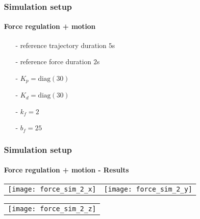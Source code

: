 \begin{frame}
  \frametitle{Simulation setup}
  \framesubtitle{Force regulation + motion}
  \begin{itemize}
  \item[-] reference trajectory duration $5$s
  \item[-] reference force duration $2$s
  \item[-] $K_p = \mathrm{diag}(30)$
  \item[-] $K_d = \mathrm{diag}(30)$
  \item[-] $k_{f} = 2$
  \item[-] $b_f = 25$
  \end{itemize}
\end{frame}

\begin{frame}
  \frametitle{Simulation setup}
  \framesubtitle{Force regulation + motion - Results}
  \begin{center}
   \vskip-0.1in
    \begin{tabular}{cc}
      \texttt{[image: force\_sim\_2\_x]} &
      \texttt{[image: force\_sim\_2\_y]}
    \end{tabular}
  \end{center}
  \begin{center}
   \vskip-0.1in
    \begin{tabular}{c}
      \texttt{[image: force\_sim\_2\_z]}
    \end{tabular}
  \end{center}
\end{frame}
